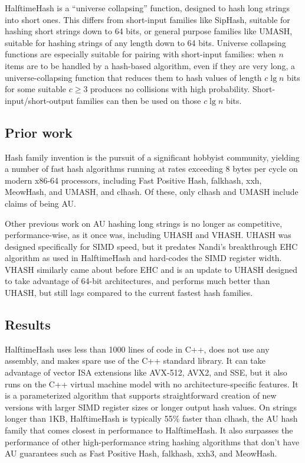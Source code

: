 \documentclass[sigconf, nonacm]{acmart}
\begin{document}
HalftimeHash is a ``universe collapsing'' function, designed to hash long strings into short ones. \cite{linear-hash-functions,hashing-without-primes-revisited,cuckoo-journal}
This differs from short-input families like SipHash, suitable for hashing short strings down to 64 bits, or general purpose families like UMASH, suitable for hashing strings of any length down to 64 bits.
Universe collapsing functions are especially suitable for pairing with short-input families: when $n$ items are to be handled by a hash-based algorithm, even if they are very long, a universe-collapsing function that reduces them to hash values of length $c \lg n$ bits for some suitable $c \geq 3$ produces no collisions with high probability.
Short-input/short-output families can then be used on those $c \lg n$ bits. \cite{universe-collapse-linear-probing,siphash,tabulation,simple-hash-functions-work}

\subsection{Prior work}

Hash family invention is the pursuit of a significant hobbyist community, yielding a number of fast hash algorithms running at rates exceeding 8 bytes per cycle on modern x86-64 processors, including Fast Positive Hash, falk\-hash, xxh, Meow\-Hash, and UMASH, and cl\-hash. \cite{smhasher}
Of these, only cl\-hash and U\-MASH include claims of being AU.

Other previous work on AU hashing long strings is no longer as competitive, performance-wise, as it once was, including UHASH and VHASH.
UHASH was designed specifically for SIMD speed, but it predates Nandi's breakthrough EHC algorithm as used in HalftimeHash and hard-codes the SIMD register width. \cite{umac,ehc-nandi}
VHASH similarly came about before EHC and is an update to UHASH designed to take advantage of 64-bit architectures, and performs much better than UHASH, but still lags compared to the current fastest hash families. \cite{vmac,smhasher}

\subsection{Results}

HalftimeHash uses less than 1000 lines of code in C++, does not use any assembly, and makes spare use of the C++ standard library.
It can take advantage of vector ISA extensions like AVX-512, AVX2, and SSE, but it also runs on the C++ virtual machine model with no architecture-specific features.
It is a parameterized algorithm that supports straightforward creation of new versions with larger SIMD register sizes or longer output hash values.
On strings longer than 1KB, HalftimeHash is typically 55\% faster than clhash, the AU hash family that comes closest in performance to HalftimeHash.
It also surpasses the performance of other high-performance string hashing algorithms that don't have AU guarantees such as Fast Positive Hash, falkhash, xxh3, and MeowHash.
\end{document}
